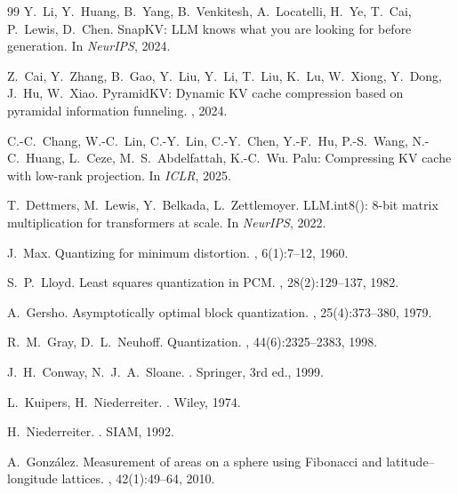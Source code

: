 \documentclass{article}
\theoremstyle{definition}
\theoremstyle{remark}
\begin{document}
{\begin{thebibliography}{99}
Y.~Li, Y.~Huang, B.~Yang, B.~Venkitesh, A.~Locatelli, H.~Ye, T.~Cai,
P.~Lewis, D.~Chen.
\newblock SnapKV: LLM knows what you are looking for before generation.
\newblock In {\em NeurIPS}, 2024.

Z.~Cai, Y.~Zhang, B.~Gao, Y.~Liu, Y.~Li, T.~Liu, K.~Lu, W.~Xiong,
Y.~Dong, J.~Hu, W.~Xiao.
\newblock PyramidKV: Dynamic KV cache compression based on pyramidal
information funneling.
, 2024.

C.-C.~Chang, W.-C.~Lin, C.-Y.~Lin, C.-Y.~Chen, Y.-F.~Hu, P.-S.~Wang,
N.-C.~Huang, L.~Ceze, M.~S.~Abdelfattah, K.-C.~Wu.
\newblock Palu: Compressing KV cache with low-rank projection.
\newblock In {\em ICLR}, 2025.

T.~Dettmers, M.~Lewis, Y.~Belkada, L.~Zettlemoyer.
\newblock LLM.int8(): 8-bit matrix multiplication for transformers at
scale.
\newblock In {\em NeurIPS}, 2022.

J.~Max.
\newblock Quantizing for minimum distortion.
, 6(1):7--12, 1960.

S.~P.~Lloyd.
\newblock Least squares quantization in PCM.
, 28(2):129--137, 1982.

A.~Gersho.
\newblock Asymptotically optimal block quantization.
, 25(4):373--380, 1979.

R.~M.~Gray, D.~L.~Neuhoff.
\newblock Quantization.
, 44(6):2325--2383, 1998.

J.~H.~Conway, N.~J.~A.~Sloane.
.
\newblock Springer, 3rd ed., 1999.

L.~Kuipers, H.~Niederreiter.
.  Wiley, 1974.

H.~Niederreiter.
.
SIAM, 1992.

A.~Gonz\'alez.
\newblock Measurement of areas on a sphere using Fibonacci and
latitude--longitude lattices.
, 42(1):49--64, 2010.


\end{thebibliography}}
\end{document}
